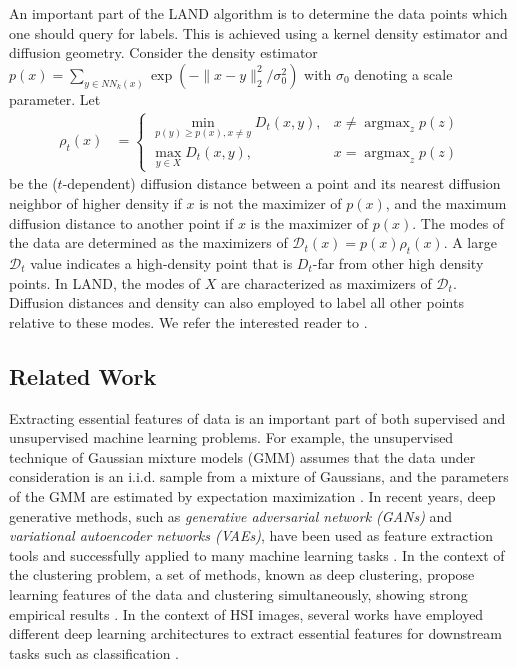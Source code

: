 \documentclass{article}
\DeclareMathOperator*{\argmax}{argmax} %
\newcommand{\Dt}{\mathcal{D}_{t}}
\begin{document}
An important part of the LAND algorithm is to determine the data points which one should query for labels. This is achieved using a kernel density estimator and diffusion geometry.  Consider the density estimator $p(x)=\sum_{y\in NN_{k}(x)}\exp(-\|x-y\|_{2}^{2}/\sigma_{0}^{2})$
with $\sigma_0$ denoting a scale parameter. Let 
\begin{align}\label{eqn:rho}
\rho_{t}(x) &=
\begin{cases}
\displaystyle\min_{p(y)\ge p(x), x\neq y} D_{t}(x,y), &x\neq \displaystyle\argmax_{z}p(z) \\
\displaystyle\max_{y\in X} D_{t}(x,y), & x=\displaystyle\argmax_{z}p(z)
\end{cases}
\end{align} be the ($t$-dependent) diffusion distance between a point and its nearest diffusion neighbor of higher density if $x$ is not the maximizer of $p(x)$, and the maximum diffusion distance to another point if $x$ is the maximizer of $p(x)$.  The modes of the data are determined as the maximizers of $\Dt(x)=p(x)\rho_{t}(x)$.  A large $\Dt$ value indicates a high-density point that is $D_{t}$-far from other high density points. In LAND, the modes of $X$ are characterized as maximizers of $\Dt$. Diffusion distances and density can also employed to label all other points relative to these modes. We refer the interested reader to 
\cite{Maggioni2019_LAND}. 


\subsection{Related Work}
Extracting essential features of data is an important part of both supervised and unsupervised machine learning problems. For example, the unsupervised technique of Gaussian mixture models (GMM) assumes that the data under consideration is an i.i.d. sample from a mixture of Gaussians, and the parameters of the GMM are estimated by expectation maximization \cite{Murphy2012_Machine}. In recent years, deep generative methods, such as \emph{generative adversarial network (GANs)} and \emph{variational autoencoder networks (VAEs)}, have been used as feature extraction tools and successfully applied to many machine learning tasks \cite{ehsan2017infinite,makhzani2015adversarial}. In the context of the clustering problem, a set of methods, known as deep clustering, propose learning features of the data and clustering simultaneously, showing strong empirical results \cite{tian2014learning,song2013auto,xie2016unsupervised,jiang2017variational}. 
In the context of HSI images, several works have employed different deep learning architectures to extract essential features for downstream tasks such as classification
\cite{chen2014deep,chen2016deep,li2017spectral,he2017multi,paoletti2019deep,zhang20191d}. 
\end{document}
